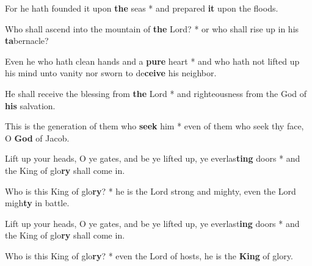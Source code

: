 \begin{multicols}{2}
	For he hath founded it upon \textbf{the} seas * and prepared \textbf{it} upon the floods.
	
	Who shall ascend into the mountain of \textbf{the} Lord? * or who shall rise up in his \textbf{ta}bernacle?
	
	Even he who hath clean hands and a \textbf{pure} heart * and who hath not lifted up his mind unto vanity nor sworn to de\textbf{ceive} his neighbor.
	
	He shall receive the blessing from \textbf{the} Lord * and righteousness from the God of \textbf{his} salvation.
	
	This is the generation of them who \textbf{seek} him * even of them who seek thy face, O \textbf{God} of Jacob.
	
	Lift up your heads, O ye gates, and be ye lifted up, ye everlas\textbf{ting} doors * and the King of glo\textbf{ry} shall come in.
	
	Who is this King of glo\textbf{ry}? * he is the Lord strong and mighty, even the Lord migh\textbf{ty} in battle.
	
	Lift up your heads, O ye gates, and be ye lifted up, ye everlast\textbf{ing} doors * and the King of glo\textbf{ry} shall come in.
	
	Who is this King of glo\textbf{ry}? * even the Lord of hosts, he is the \textbf{King} of glory.
\end{multicols}